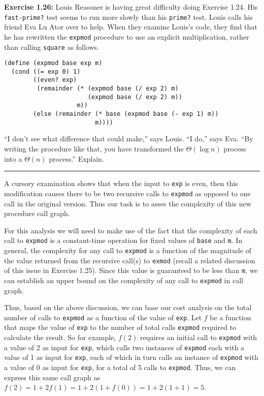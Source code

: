 \documentclass{article}
\begin{document}

\noindent \textbf{Exercise 1.26:} Louis Reasoner is having great difficulty
doing Exercise 1.24.  His \lstinline{fast-prime?} test seems to run more slowly
than his \lstinline{prime?} test.  Louis calls his friend Eva Lu Ator over to
help.  When they examine Louis's code, they find that he has rewritten the
\lstinline{expmod} procedure to use an explicit multiplication, rather than
calling \lstinline{square} as follows. \vspace{1mm}

\begin{lstlisting}[style=scheme]
(define (expmod base exp m)
  (cond ((= exp 0) 1)
        ((even? exp)
         (remainder (* (expmod base (/ exp 2) m)
                       (expmod base (/ exp 2) m))
                    m))
        (else (remainder (* base (expmod base (- exp 1) m))
                         m))))
\end{lstlisting}
``I don't see what difference that could make,'' says Louis.  ``I do,'' says
Eva.  ``By writing the procedure like that, you have transformed the
$\Theta(\log n)$ process into a $\Theta(n)$ process.''  Explain.

\vspace{3mm}
\hrule
\vspace{5mm}

A cursory examination shows that when the input to \lstinline{exp} is even, then
this modification causes there to be two recursive calls to \lstinline{expmod}
as opposed to one call in the original version.  Thus our task is to asses the
complexity of this new procedure call graph.

For this analysis we will need to make use of the fact that the complexity of
each call to \lstinline{expmod} is a constant-time operation for fixed values of
\lstinline{base} and \lstinline{m}.  In general, the complexity for any call to
\lstinline{expmod} is a function of the magnitude of the value returned from the
recursive call(s) to \lstinline{exmod} (recall a related discussion of this
issue in Exercise 1.25).  Since this value is guaranteed to be less than
\lstinline{m}, we can establish an upper bound on the complexity of any call to
\lstinline{expmod} in call graph.

Thus, based on the above discussion, we can base our cost analysis on the total
number of calls to \lstinline{expmod} as a function of the value of
\lstinline{exp}.  Let $f$ be a function that maps the value of \lstinline{exp}
to the number of total calls \lstinline{expmod} required to calculate the
result.  So for example, $f(2)$ requires an initial call to \lstinline{expmod}
with a value of 2 as input for \lstinline{exp}, which calls two instances of
\lstinline{expmod} each with a value of 1 as input for \lstinline{exp}, each of
which in turn calls an instance of \lstinline{expmod} with a value of 0 as input
for \lstinline{exp}, for a total of 5 calls to \lstinline{expmod}.  Thus, we can
express this same call graph as
$f(2) = 1 + 2 f(1) = 1 + 2(1 + f(0)) = 1 + 2(1 + 1) = 5$.
\end{document}

